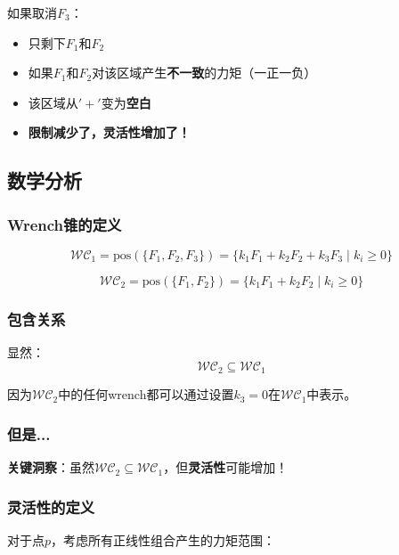 \documentclass[12pt,a4paper]{article}
\begin{document}
如果取消$F_3$：
\begin{itemize}
    \item 只剩下$F_1$和$F_2$
    \item 如果$F_1$和$F_2$对该区域产生\textbf{不一致}的力矩（一正一负）
    \item 该区域从$'+'$变为\textbf{空白}
    \item \textbf{限制减少了，灵活性增加了！}
\end{itemize}

\subsection{数学分析}

\subsubsection{Wrench锥的定义}

\begin{equation}
\mathcal{WC}_1 = \text{pos}(\{F_1, F_2, F_3\}) = \{k_1 F_1 + k_2 F_2 + k_3 F_3 \mid k_i \geq 0\}
\end{equation}

\begin{equation}
\mathcal{WC}_2 = \text{pos}(\{F_1, F_2\}) = \{k_1 F_1 + k_2 F_2 \mid k_i \geq 0\}
\end{equation}

\subsubsection{包含关系}

显然：
\begin{equation}
\mathcal{WC}_2 \subseteq \mathcal{WC}_1
\end{equation}

因为$\mathcal{WC}_2$中的任何wrench都可以通过设置$k_3 = 0$在$\mathcal{WC}_1$中表示。

\subsubsection{但是...}

\textbf{关键洞察}：虽然$\mathcal{WC}_2 \subseteq \mathcal{WC}_1$，但\textbf{灵活性}可能增加！

\subsubsection{灵活性的定义}

对于点$p$，考虑所有正线性组合产生的力矩范围：
\end{document}
